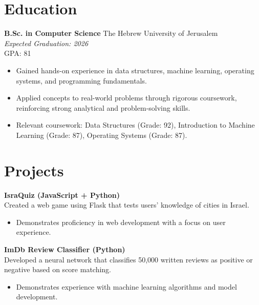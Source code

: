 \documentclass[a4paper,10pt]{article}
\begin{document}
\section*{Education}
\textbf{B.Sc. in Computer Science} \hfill The Hebrew University of Jerusalem \\
\textit{Expected Graduation: 2026} \\
GPA: 81
\begin{itemize}[noitemsep,nolistsep]
    \item Gained hands-on experience in data structures, machine learning, operating systems, and programming fundamentals.
    \item Applied concepts to real-world problems through rigorous coursework, reinforcing strong analytical and problem-solving skills.
    \item Relevant coursework: Data Structures (Grade: 92), Introduction to Machine Learning (Grade: 87), Operating Systems (Grade: 87).
\end{itemize}

\section*{Projects}
\textbf{IsraQuiz (JavaScript + Python)} \\
Created a web game using Flask that tests users' knowledge of cities in Israel. 
\begin{itemize}[noitemsep,nolistsep]
    \item  Demonstrates proficiency in web development with a focus on user experience.
\end{itemize}

\textbf{ImDb Review Classifier (Python)} \\
Developed a neural network that classifies 50,000 written reviews as positive or negative based on score matching.
\begin{itemize}[noitemsep,nolistsep]
    \item  Demonstrates experience with machine learning algorithms and model development.
\end{itemize}
\end{document}
